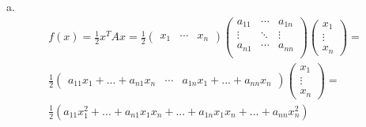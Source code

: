 \documentclass[fleqn]{article}
\begin{document}
a. \\
\begin{align*}
f(x) = \frac{1}{2} x^TAx = \frac{1}{2}
	\begin{pmatrix} x_1 & \cdots & x_n \end{pmatrix}
	\begin{pmatrix} a_{11} & \cdots & a_{1n} \\
	\vdots & \ddots & \vdots \\
	a_{n1} & \cdots & a_{nn} \\	
	\end{pmatrix}
	\begin{pmatrix} x_1 \\ \vdots \\ x_n \end{pmatrix}
= \\
\frac{1}{2}
\begin{pmatrix}
a_{11}x_1 + ... + a_{n1}x_n & \cdots &  a_{1n}x_1 + ... + a_{nn}x_n
\end{pmatrix}
\begin{pmatrix} x_1 \\ \vdots \\ x_n \end{pmatrix}
= \\
\frac{1}{2}
\left(
  a_{11}x_1^2 + ... + a_{n1} x_1 x_n + ... +  a_{1n} x_1 x_n + ... + a_{nn}x_n^2
\right)
\end{align*} \\
\end{document}
